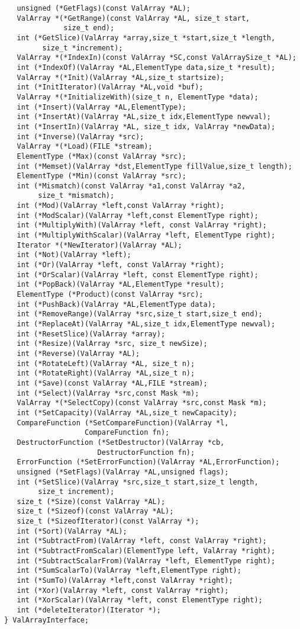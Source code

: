 \begin{verbatim}
   unsigned (*GetFlags)(const ValArray *AL);
   ValArray *(*GetRange)(const ValArray *AL, size_t start,
              size_t end);
   int (*GetSlice)(ValArray *array,size_t *start,size_t *length,
         size_t *increment);
   ValArray *(*IndexIn)(const ValArray *SC,const ValArraySize_t *AL);
   int (*IndexOf)(ValArray *AL,ElementType data,size_t *result);
   ValArray *(*Init)(ValArray *AL,size_t startsize);
   int (*InitIterator)(ValArray *AL,void *buf);
   ValArray *(*InitializeWith)(size_t n, ElementType *data);
   int (*Insert)(ValArray *AL,ElementType);
   int (*InsertAt)(ValArray *AL,size_t idx,ElementType newval);
   int (*InsertIn)(ValArray *AL, size_t idx, ValArray *newData);
   int (*Inverse)(ValArray *src);
   ValArray *(*Load)(FILE *stream);
   ElementType (*Max)(const ValArray *src);
   int (*Memset)(ValArray *dst,ElementType fillValue,size_t length);
   ElementType (*Min)(const ValArray *src);
   int (*Mismatch)(const ValArray *a1,const ValArray *a2,
        size_t *mismatch);
   int (*Mod)(ValArray *left,const ValArray *right);
   int (*ModScalar)(ValArray *left,const ElementType right);
   int (*MultiplyWith)(ValArray *left, const ValArray *right);
   int (*MultiplyWithScalar)(ValArray *left, ElementType right);
   Iterator *(*NewIterator)(ValArray *AL);
   int (*Not)(ValArray *left);
   int (*Or)(ValArray *left, const ValArray *right);
   int (*OrScalar)(ValArray *left, const ElementType right);
   int (*PopBack)(ValArray *AL,ElementType *result);
   ElementType (*Product)(const ValArray *src);
   int (*PushBack)(ValArray *AL,ElementType data);
   int (*RemoveRange)(ValArray *src,size_t start,size_t end);
   int (*ReplaceAt)(ValArray *AL,size_t idx,ElementType newval);
   int (*ResetSlice)(ValArray *array);
   int (*Resize)(ValArray *src, size_t newSize);
   int (*Reverse)(ValArray *AL);
   int (*RotateLeft)(ValArray *AL, size_t n);
   int (*RotateRight)(ValArray *AL,size_t n);
   int (*Save)(const ValArray *AL,FILE *stream);
   int (*Select)(ValArray *src,const Mask *m);
   ValArray *(*SelectCopy)(const ValArray *src,const Mask *m);
   int (*SetCapacity)(ValArray *AL,size_t newCapacity);
   CompareFunction (*SetCompareFunction)(ValArray *l,
                   CompareFunction fn);
   DestructorFunction (*SetDestructor)(ValArray *cb,
                      DestructorFunction fn);
   ErrorFunction (*SetErrorFunction)(ValArray *AL,ErrorFunction);
   unsigned (*SetFlags)(ValArray *AL,unsigned flags);
   int (*SetSlice)(ValArray *src,size_t start,size_t length,
        size_t increment);
   size_t (*Size)(const ValArray *AL);
   size_t (*Sizeof)(const ValArray *AL);
   size_t (*SizeofIterator)(const ValArray *);
   int (*Sort)(ValArray *AL);
   int (*SubtractFrom)(ValArray *left, const ValArray *right);
   int (*SubtractFromScalar)(ElementType left, ValArray *right);
   int (*SubtractScalarFrom)(ValArray *left, ElementType right);
   int (*SumScalarTo)(ValArray *left,ElementType right);
   int (*SumTo)(ValArray *left,const ValArray *right);
   int (*Xor)(ValArray *left, const ValArray *right);
   int (*XorScalar)(ValArray *left, const ElementType right);
   int (*deleteIterator)(Iterator *);
} ValArrayInterface;
\end{verbatim}
